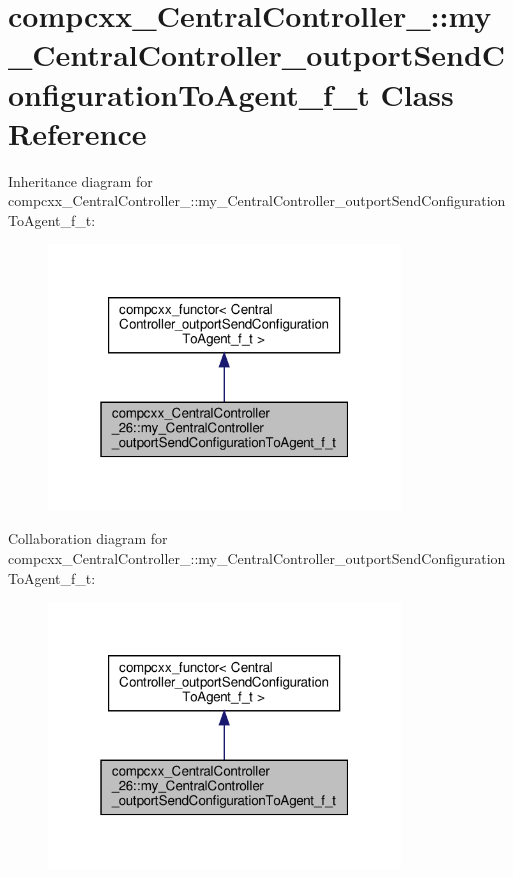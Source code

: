 \hypertarget{classcompcxx__CentralController__26_1_1my__CentralController__outportSendConfigurationToAgent__f__t}{}\section{compcxx\+\_\+\+Central\+Controller\+\_\+:\+:my\+\_\+\+Central\+Controller\+\_\+outport\+Send\+Configuration\+To\+Agent\+\_\+f\+\_\+t Class Reference}
\label{classcompcxx__CentralController__26_1_1my__CentralController__outportSendConfigurationToAgent__f__t}


Inheritance diagram for compcxx\+\_\+\+Central\+Controller\+\_\+:\+:my\+\_\+\+Central\+Controller\+\_\+outport\+Send\+Configuration\+To\+Agent\+\_\+f\+\_\+t\+:\nopagebreak
\begin{figure}[H]
\begin{center}
\leavevmode
\includegraphics[width=265pt]{classcompcxx__CentralController__26_1_1my__CentralController__outportSendConfigurationToAgent__f__t__inherit__graph}
\end{center}
\end{figure}


Collaboration diagram for compcxx\+\_\+\+Central\+Controller\+\_\+:\+:my\+\_\+\+Central\+Controller\+\_\+outport\+Send\+Configuration\+To\+Agent\+\_\+f\+\_\+t\+:\nopagebreak
\begin{figure}[H]
\begin{center}
\leavevmode
\includegraphics[width=265pt]{classcompcxx__CentralController__26_1_1my__CentralController__outportSendConfigurationToAgent__f__t__coll__graph}
\end{center}
\end{figure}
